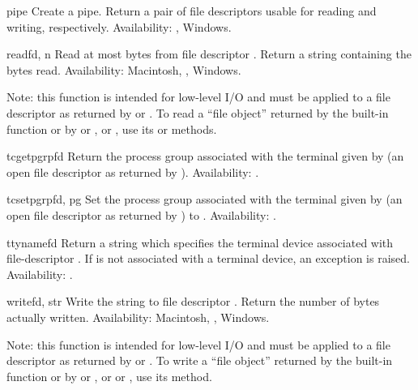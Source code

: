 \begin{funcdesc}{pipe}{}
Create a pipe.  Return a pair of file descriptors  usable for reading and writing, respectively.
Availability: \UNIX{}, Windows.
\end{funcdesc}

\begin{funcdesc}{read}{fd, n}
Read at most  bytes from file descriptor .
Return a string containing the bytes read.
Availability: Macintosh, \UNIX{}, Windows.

Note: this function is intended for low-level I/O and must be applied
to a file descriptor as returned by  or
.  To read a ``file object'' returned by the
built-in function  or by  or
, or , use its
 or  methods.
\end{funcdesc}

\begin{funcdesc}{tcgetpgrp}{fd}
Return the process group associated with the terminal given by
 (an open file descriptor as returned by ).
Availability: \UNIX{}.
\end{funcdesc}

\begin{funcdesc}{tcsetpgrp}{fd, pg}
Set the process group associated with the terminal given by
 (an open file descriptor as returned by )
to .
Availability: \UNIX{}.
\end{funcdesc}

\begin{funcdesc}{ttyname}{fd}
Return a string which specifies the terminal device associated with
file-descriptor .  If  is not associated with a terminal
device, an exception is raised.
Availability: \UNIX{}.
\end{funcdesc}

\begin{funcdesc}{write}{fd, str}
Write the string  to file descriptor .
Return the number of bytes actually written.
Availability: Macintosh, \UNIX{}, Windows.

Note: this function is intended for low-level I/O and must be applied
to a file descriptor as returned by  or
.  To write a ``file object'' returned by the
built-in function  or by  or
, or  or , use
its  method.
\end{funcdesc}


